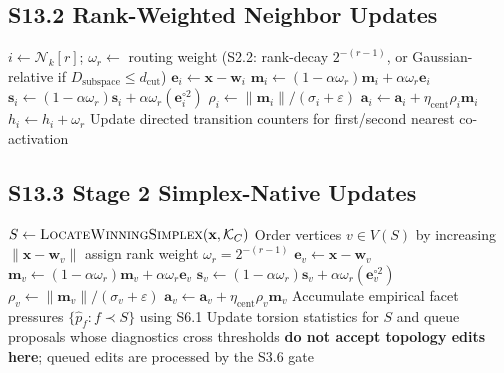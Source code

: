 \documentclass[11pt]{article}
\begin{document}
\subsection*{S13.2 Rank-Weighted Neighbor Updates}
\begin{algorithm}[h]
\caption{Rank-weighted neighbor updates}
\label{alg:rank-weighted-updates}
\begin{algorithmic}[1]
        \State $i\gets\mathcal N_k[r]$; $\omega_r\gets$ routing weight (S2.2: rank-decay $2^{-(r-1)}$, or Gaussian-relative if $D_{\mathrm{subspace}}\le d_{\mathrm{cut}}$)
        \State $\mathbf e_i\gets\mathbf x-\mathbf w_i$
        \State $\mathbf m_i\gets(1-\alpha\omega_r)\mathbf m_i+\alpha\omega_r\mathbf e_i$
        \State $\mathbf s_i\gets(1-\alpha\omega_r)\mathbf s_i+\alpha\omega_r(\mathbf e_i^{\circ2})$
        \State $\rho_i\gets\|\mathbf m_i\|/(\sigma_i+\varepsilon)$
        \State $\mathbf a_i\gets\mathbf a_i+\eta_{\mathrm{cent}}\rho_i\mathbf m_i$
        \State {}
        \State $h_i\gets h_i+\omega_r$
    \EndFor
    \State Update directed transition counters for first/second nearest co-activation
\EndProcedure
\end{algorithmic}
\end{algorithm}

\subsection*{S13.3 Stage 2 Simplex-Native Updates}
\begin{algorithm}[h]
\caption{Simplex-native updates (Stage 2)}
\label{alg:stage2-simplex-updates}
\begin{algorithmic}[1]
    \State $S\gets\textsc{LocateWinningSimplex}(\mathbf x,\mathcal K_C)$
    \State Order vertices $v\in V(S)$ by increasing $\|\mathbf x-\mathbf w_v\|$
        \State assign rank weight $\omega_r=2^{-(r-1)}$
        \State $\mathbf e_v\gets\mathbf x-\mathbf w_v$
        \State $\mathbf m_v\gets(1-\alpha\omega_r)\mathbf m_v+\alpha\omega_r\mathbf e_v$
        \State $\mathbf s_v\gets(1-\alpha\omega_r)\mathbf s_v+\alpha\omega_r(\mathbf e_v^{\circ2})$
        \State $\rho_v\gets\|\mathbf m_v\|/(\sigma_v+\varepsilon)$
        \State $\mathbf a_v\gets\mathbf a_v+\eta_{\mathrm{cent}}\rho_v\mathbf m_v$
    \EndFor
    \State Accumulate empirical facet pressures $\{\hat p_f:f\prec S\}$ using S6.1
    \State Update torsion statistics for $S$ and queue proposals whose diagnostics cross thresholds
    \State \textbf{do not accept topology edits here}; queued edits are processed by the S3.6 gate
\EndProcedure
\end{algorithmic}
\end{algorithm}
\end{document}
